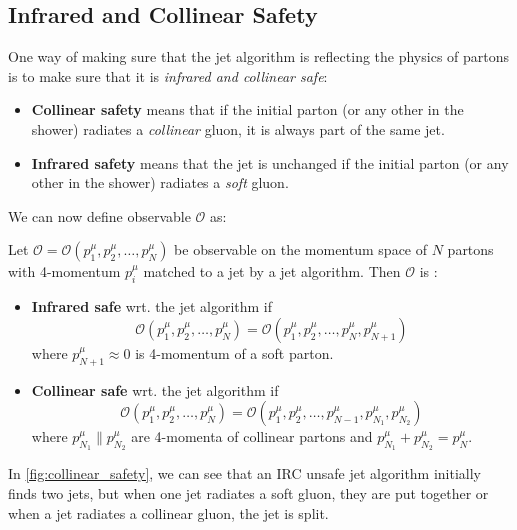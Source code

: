 \subsection{Infrared and Collinear Safety}
\label{sec:IR_coll_safe}
One way of making sure that the jet algorithm is reflecting the physics of partons is to make sure that it is \emph{infrared and collinear safe}:
\begin{itemize}
    \item \textbf{Collinear safety} means that if the initial parton (or any other in the shower) radiates a \emph{collinear} gluon, it is always part of the same jet.
    \item \textbf{Infrared safety} means that the jet is unchanged if the initial parton (or any other in the shower) radiates a \emph{soft} gluon.
\end{itemize}
We can now define \IRC observable $\mathcal{O}$ as:
\begin{defn}
    \label{def:IRC}

    Let $\mathcal{O} = \mathcal{O}(p_1^\mu, p_2^\mu, \dots, p_N^\mu)$ be observable on the momentum space of $N$ partons with 4-momentum $p_i^\mu$ matched to a jet by a jet algorithm.
    Then $\mathcal{O}$ is :
    \begin{itemize}
        \item \textbf{Infrared safe} wrt. the jet algorithm if 
        $$ \mathcal{O}(p_1^\mu, p_2^\mu, \dots, p_N^\mu) = \mathcal{O}(p_1^\mu, p_2^\mu, \dots, p_N^\mu, p_{N+1}^\mu) $$
        where $p_{N+1}^\mu \approx 0$ is 4-momentum of a soft parton.
        \item \textbf{Collinear safe} wrt. the jet algorithm if 
        $$ \mathcal{O}(p_1^\mu, p_2^\mu, \dots, p_N^\mu) = \mathcal{O}(p_1^\mu, p_2^\mu, \dots,p_{N-1}^\mu, p_{N_1}^\mu, p_{N_2}^\mu) $$
        where $p_{N_1}^\mu \parallel p_{N_2}^\mu$ are 4-momenta of collinear partons and $p_{N_1}^\mu + p_{N_2}^\mu = p_{N}^\mu$.
    \end{itemize}
\end{defn}

In \cref{fig:collinear_safety}, we can see that an IRC unsafe jet algorithm initially finds two jets, but when one jet radiates a soft gluon, they are put together or when a jet radiates a collinear gluon, the jet is split.

